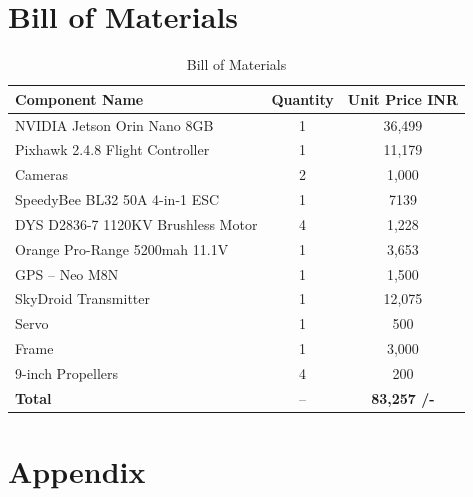 \documentclass[12pt]{report}
\begin{document}
  \chapter{Bill of Materials}
    \begin{table}[h!]
      \centering
      \caption{Bill of Materials} \vspace{0.2cm}
        \begin{tabular}{|l|c|c|}
          \hline
          \textbf{Component Name} & \textbf{Quantity} & \textbf{Unit Price {INR}} \\
          \hline
          NVIDIA Jetson Orin Nano 8GB & 1 & 36,499 \\
          Pixhawk 2.4.8 Flight Controller & 1 & 11,179 \\
          Cameras & 2 & 1,000 \\
          SpeedyBee BL32 50A 4-in-1 ESC &1 &7139\\
          DYS D2836-7 1120KV Brushless Motor &4 &1,228\\
          Orange Pro-Range 5200mah 11.1V & 1 &3,653\\
          GPS – Neo M8N  &1 &1,500\\
          SkyDroid Transmitter  &1 & 12,075\\
          Servo & 1& 500\\
          Frame  &1& 3,000\\
          9-inch Propellers & 4 &200\\
          \hline
          \textbf{Total}  & --  & \textbf{83,257 /-}   \\      
          \hline
        \end{tabular}
    \end{table}

   \chapter{Appendix} 
\end{document}
